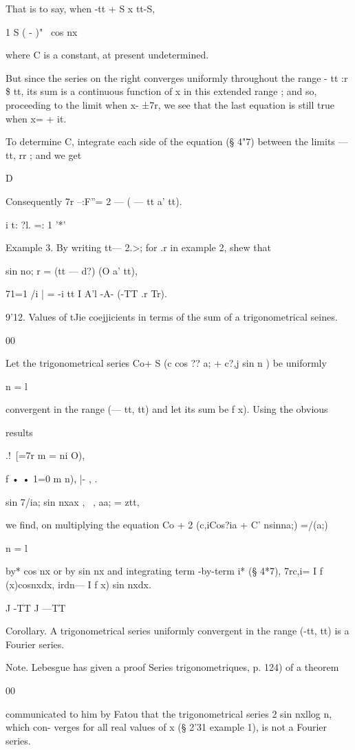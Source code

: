 That is to say, when -tt + S x tt-S, 

  1   S ( - )"~  cos nx 

where C is a constant, at present undetermined. 

But since the series on the right converges uniformly throughout the range - tt   :r \$ tt, 
its sum is a continuous function of x in this extended range ; and so, proceeding to the 
limit when x-  ±7r, we see that the last equation is still true when x= + it. 

To determine C, integrate each side of the equation (§ 4"7) between the limits — tt, rr ; 
and we get 

D 

Consequently 7r --:F''= 2   —   ( — tt a' tt). 

i   t: ?l. =: 1 '*' 

Example 3. By writing tt— 2.>; for .r in example 2, shew that 

  sin  no; r =   (tt — d?) (O a' tt), 

71=1 /i  | = -i  tt I A'l -A-  (-TT .r Tr). 

9'12. Values of tJie coejjicients in terms of the sum of a trigonometrical   
seines. 

00 

Let the trigonometrical series  Co+ S (c  cos ?? a; + c?,j sin n ) be uniformly 

n = l 

convergent in the range (— tt, tt) and let its sum be f x). Using the obvious 

results 

.!\   [=7r  m = ni O), 

f • •  1=0  m n), |- , .  

sin 7/ia; sin nxax   , \  , aa; = ztt, 

we find, on multiplying the equation  Co + 2 (c,iCos?ia  + C' nsinna;) =/(a;) 

n = l 

by* cos nx or by sin nx and integrating term -by-term i* (§ 4*7), 
7rc,i= I f (x)cosnxdx, irdn— I f x) sin nxdx. 

J -TT J —TT 

Corollary. A trigonometrical series uniformly convergent in the range (-tt, tt) is a 
Fourier series. 

Note. Lebesgue has given a proof  Series trigonometriques, p. 124) of a theorem 

00 

communicated to him by Fatou that the trigonometrical series 2 sin nxllog n, which con- 
verges for all real values of x (§ 2'31 example 1), is not a Fourier series. 

